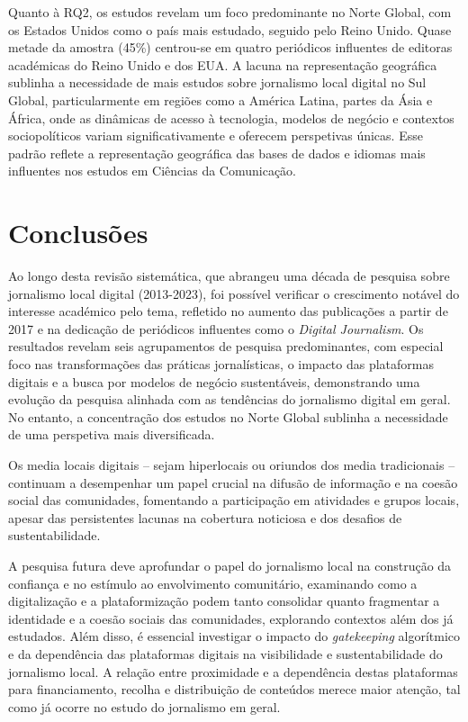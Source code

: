 \documentclass[portuguese]{textolivre}
\begin{document}
Quanto à RQ2, os estudos revelam um foco predominante no Norte Global, com os Estados Unidos como o país mais estudado, seguido pelo Reino Unido. Quase metade da amostra (45\%) centrou-se em quatro periódicos influentes de editoras académicas do Reino Unido e dos EUA. A lacuna na representação geográfica sublinha a necessidade de mais estudos sobre jornalismo local digital no Sul Global, particularmente em regiões como a América Latina, partes da Ásia e África, onde as dinâmicas de acesso à tecnologia, modelos de negócio e contextos sociopolíticos variam significativamente e oferecem perspetivas únicas. Esse padrão reflete a representação geográfica das bases de dados e idiomas mais influentes nos estudos em Ciências da Comunicação.

\section{Conclusões}
Ao longo desta revisão sistemática, que abrangeu uma década de pesquisa sobre jornalismo local digital (2013-2023), foi possível verificar o crescimento notável do interesse académico pelo tema, refletido no aumento das publicações a partir de 2017 e na dedicação de periódicos influentes como o \textit{Digital Journalism}. Os resultados revelam seis agrupamentos de pesquisa predominantes, com especial foco nas transformações das práticas jornalísticas, o impacto das plataformas digitais e a busca por modelos de negócio sustentáveis, demonstrando uma evolução da pesquisa alinhada com as tendências do jornalismo digital em geral. No entanto, a concentração dos estudos no Norte Global sublinha a necessidade de uma perspetiva mais diversificada.

Os media locais digitais – sejam hiperlocais ou oriundos dos media tradicionais – continuam a desempenhar um papel crucial na difusão de informação e na coesão social das comunidades, fomentando a participação em atividades e grupos locais, apesar das persistentes lacunas na cobertura noticiosa e dos desafios de sustentabilidade.

A pesquisa futura deve aprofundar o papel do jornalismo local na construção da confiança e no estímulo ao envolvimento comunitário, examinando como a digitalização e a plataformização podem tanto consolidar quanto fragmentar a identidade e a coesão sociais das comunidades, explorando contextos além dos já estudados. Além disso, é essencial investigar o impacto do \textit{gatekeeping} algorítmico e da dependência das plataformas digitais na visibilidade e sustentabilidade do jornalismo local. A relação entre proximidade e a dependência destas plataformas para financiamento, recolha e distribuição de conteúdos merece maior atenção, tal como já ocorre no estudo do jornalismo em geral.
\end{document}
